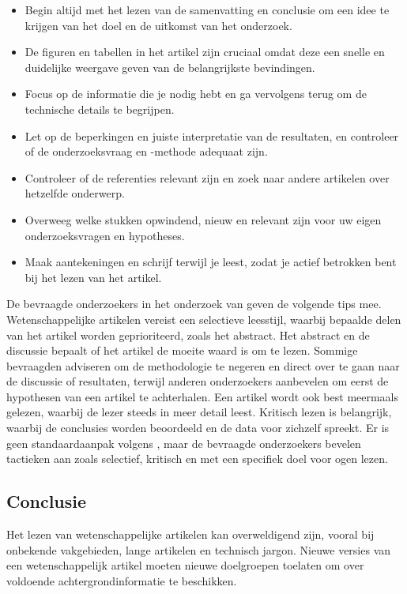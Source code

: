\begin{itemize}
	\item Begin altijd met het lezen van de samenvatting en conclusie om een idee te krijgen van het doel en de uitkomst van het onderzoek.
	\item De figuren en tabellen in het artikel zijn cruciaal omdat deze een snelle en duidelijke weergave geven van de belangrijkste bevindingen.
	\item Focus op de informatie die je nodig hebt en ga vervolgens terug om de technische details te begrijpen.
	\item Let op de beperkingen en juiste interpretatie van de resultaten, en controleer of de onderzoeksvraag en -methode adequaat zijn.
	\item Controleer of de referenties relevant zijn en zoek naar andere artikelen over hetzelfde onderwerp.
	\item Overweeg welke stukken opwindend, nieuw en relevant zijn voor uw eigen onderzoeksvragen en hypotheses.
	\item Maak aantekeningen en schrijf terwijl je leest, zodat je actief betrokken bent bij het lezen van het artikel.
\end{itemize}

De bevraagde onderzoekers in het onderzoek van \textcite{Hubbard2017} geven de volgende tips mee. Wetenschappelijke artikelen vereist een selectieve leesstijl, waarbij bepaalde delen van het artikel worden geprioriteerd, zoals het abstract. Het abstract en de discussie bepaalt of het artikel de moeite waard is om te lezen. Sommige bevraagden adviseren om de methodologie te negeren en direct over te gaan naar de discussie of resultaten, terwijl anderen onderzoekers aanbevelen om eerst de hypothesen van een artikel te achterhalen. Een artikel wordt ook best meermaals gelezen, waarbij de lezer steeds in meer detail leest. Kritisch lezen is belangrijk, waarbij de conclusies worden beoordeeld en de data voor zichzelf spreekt. Er is geen standaardaanpak volgens \textcite{Hubbard2017}, maar de bevraagde onderzoekers bevelen tactieken aan zoals selectief, kritisch en met een specifiek doel voor ogen lezen.

\subsection{Conclusie}

Het lezen van wetenschappelijke artikelen kan overweldigend zijn, vooral bij onbekende vakgebieden, lange artikelen en technisch jargon. Nieuwe versies van een wetenschappelijk artikel moeten nieuwe doelgroepen toelaten om over voldoende achtergrondinformatie te beschikken.

